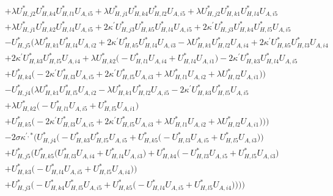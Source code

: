 \begin{align}
 &+\lambda U^*_{{H},{j 2}} U^*_{{H},{k 4}} U^*_{{H},{l 1}} U_{A,{i 5}} +\lambda U^*_{{H},{j 1}} U^*_{{H},{k 4}} U^*_{{H},{l 2}} U_{A,{i 5}} +\lambda U^*_{{H},{j 2}} U^*_{{H},{k 1}} U^*_{{H},{l 4}} U_{A,{i 5}} \nonumber \\ 
 &+\lambda U^*_{{H},{j 1}} U^*_{{H},{k 2}} U^*_{{H},{l 4}} U_{A,{i 5}} +2 \kappa^\prime U^*_{{H},{j 3}} U^*_{{H},{k 5}} U^*_{{H},{l 4}} U_{A,{i 5}} +2 \kappa^\prime U^*_{{H},{j 3}} U^*_{{H},{k 4}} U^*_{{H},{l 5}} U_{A,{i 5}} \nonumber \\ 
 &- U^*_{{H},{j 5}} \Big(\lambda U^*_{{H},{k 1}} U^*_{{H},{l 4}} U_{A,{i 2}} +2 \kappa^\prime U^*_{{H},{k 5}} U^*_{{H},{l 4}} U_{A,{i 3}} - \lambda U^*_{{H},{k 1}} U^*_{{H},{l 2}} U_{A,{i 4}} +2 \kappa^\prime U^*_{{H},{k 5}} U^*_{{H},{l 3}} U_{A,{i 4}} \nonumber \\ 
 &+2 \kappa^\prime U^*_{{H},{k 3}} U^*_{{H},{l 5}} U_{A,{i 4}} +\lambda U^*_{{H},{k 2}} \Big(- U^*_{{H},{l 1}} U_{A,{i 4}}  + U^*_{{H},{l 4}} U_{A,{i 1}} \Big)-2 \kappa^\prime U^*_{{H},{k 3}} U^*_{{H},{l 4}} U_{A,{i 5}} \nonumber \\ 
 &+U^*_{{H},{k 4}} \Big(-2 \kappa^\prime U^*_{{H},{l 3}} U_{A,{i 5}}  + 2 \kappa^\prime U^*_{{H},{l 5}} U_{A,{i 3}}  + \lambda U^*_{{H},{l 1}} U_{A,{i 2}}  + \lambda U^*_{{H},{l 2}} U_{A,{i 1}} \Big)\Big)\nonumber \\ 
 &- U^*_{{H},{j 4}} \Big(\lambda U^*_{{H},{k 1}} U^*_{{H},{l 5}} U_{A,{i 2}} - \lambda U^*_{{H},{k 1}} U^*_{{H},{l 2}} U_{A,{i 5}} -2 \kappa^\prime U^*_{{H},{k 3}} U^*_{{H},{l 5}} U_{A,{i 5}} \nonumber \\ 
 &+\lambda U^*_{{H},{k 2}} \Big(- U^*_{{H},{l 1}} U_{A,{i 5}}  + U^*_{{H},{l 5}} U_{A,{i 1}} \Big)\nonumber \\ 
 &+U^*_{{H},{k 5}} \Big(-2 \kappa^\prime U^*_{{H},{l 3}} U_{A,{i 5}}  + 2 \kappa^\prime U^*_{{H},{l 5}} U_{A,{i 3}}  + \lambda U^*_{{H},{l 1}} U_{A,{i 2}}  + \lambda U^*_{{H},{l 2}} U_{A,{i 1}} \Big)\Big)\Big)\nonumber \\ 
 &-2 \sigma \kappa^{\prime,*} \Big(U^*_{{H},{j 4}} \Big(- U^*_{{H},{k 3}} U^*_{{H},{l 5}} U_{A,{i 5}}  + U^*_{{H},{k 5}} \Big(- U^*_{{H},{l 3}} U_{A,{i 5}}  + U^*_{{H},{l 5}} U_{A,{i 3}} \Big)\Big)\nonumber \\ 
 &+U^*_{{H},{j 5}} \Big(U^*_{{H},{k 5}} \Big(U^*_{{H},{l 3}} U_{A,{i 4}}  + U^*_{{H},{l 4}} U_{A,{i 3}} \Big)+U^*_{{H},{k 4}} \Big(- U^*_{{H},{l 3}} U_{A,{i 5}}  + U^*_{{H},{l 5}} U_{A,{i 3}} \Big)\nonumber \\ 
 &+U^*_{{H},{k 3}} \Big(- U^*_{{H},{l 4}} U_{A,{i 5}}  + U^*_{{H},{l 5}} U_{A,{i 4}} \Big)\Big)\nonumber \\ 
 &+U^*_{{H},{j 3}} \Big(- U^*_{{H},{k 4}} U^*_{{H},{l 5}} U_{A,{i 5}}  + U^*_{{H},{k 5}} \Big(- U^*_{{H},{l 4}} U_{A,{i 5}}  + U^*_{{H},{l 5}} U_{A,{i 4}} \Big)\Big)\Big)\Big)\end{align} 
